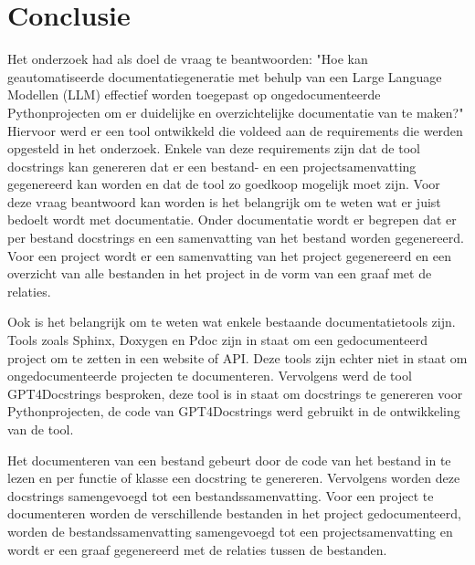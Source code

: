 
\chapter{Conclusie}%
\label{ch:conclusie}


Het onderzoek had als doel de vraag te beantwoorden: "Hoe kan geautomatiseerde documentatiegeneratie met behulp van een Large Language Modellen (LLM) effectief worden toegepast op ongedocumenteerde Pythonprojecten om er duidelijke en overzichtelijke documentatie van te maken?"
Hiervoor werd er een tool ontwikkeld die voldeed aan de requirements die werden opgesteld in het onderzoek.
Enkele van deze requirements zijn dat de tool docstrings kan genereren dat er een bestand- en een projectsamenvatting gegenereerd kan worden en dat de tool zo goedkoop mogelijk moet zijn.
Voor deze vraag beantwoord kan worden is het belangrijk om te weten wat er juist bedoelt wordt met documentatie.
Onder documentatie wordt er begrepen dat er per bestand docstrings en een samenvatting van het bestand worden gegenereerd.
Voor een project wordt er een samenvatting van het project gegenereerd en een overzicht van alle bestanden in het project in de vorm van een graaf met de relaties.

Ook is het belangrijk om te weten wat enkele bestaande documentatietools zijn.
Tools zoals Sphinx, Doxygen en Pdoc zijn in staat om een gedocumenteerd project om te zetten in een website of API.
Deze tools zijn echter niet in staat om ongedocumenteerde projecten te documenteren.
Vervolgens werd de tool GPT4Docstrings besproken, deze tool is in staat om docstrings te genereren voor Pythonprojecten, de code van GPT4Docstrings werd gebruikt in de ontwikkeling van de tool.

Het documenteren van een bestand gebeurt door de code van het bestand in te lezen en per functie of klasse een docstring te genereren.
Vervolgens worden deze docstrings samengevoegd tot een bestandssamenvatting.
Voor een project te documenteren worden de verschillende bestanden in het project gedocumenteerd, worden de bestandssamenvatting samengevoegd tot een projectsamenvatting en wordt er een graaf gegenereerd met de relaties tussen de bestanden.

